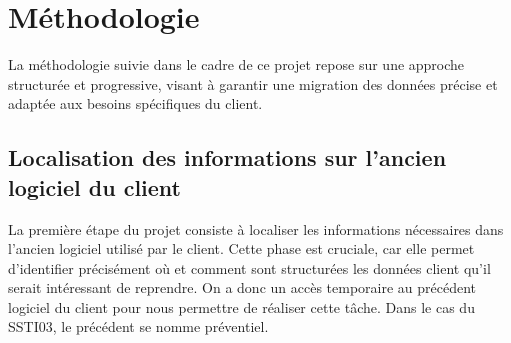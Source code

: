 \section{Méthodologie}

La méthodologie suivie dans le cadre de ce projet repose sur une approche structurée et progressive, visant à garantir une migration des données précise et adaptée aux besoins spécifiques du client. 

\subsection{Localisation des informations sur l’ancien logiciel du client}

La première étape du projet consiste à localiser les informations nécessaires dans l’ancien logiciel utilisé par le client. Cette phase est cruciale, car elle permet d’identifier précisément où et comment sont structurées les données client qu'il serait intéressant de reprendre. 
On a donc un accès temporaire au précédent logiciel du client pour nous permettre de réaliser cette tâche. Dans le cas du SSTI03, le précédent se nomme préventiel.

